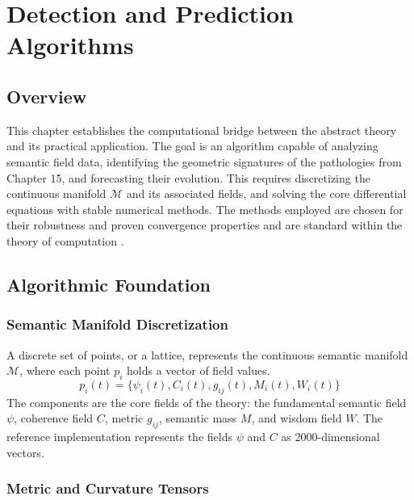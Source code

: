 \chapter{Detection and Prediction Algorithms}

\section{Overview}

This chapter establishes the computational bridge between the abstract theory and its practical application. The goal is an algorithm capable of analyzing semantic field data, identifying the geometric signatures of the pathologies from Chapter 15, and forecasting their evolution. This requires discretizing the continuous manifold \(\mathcal{M}\) and its associated fields, and solving the core differential equations with stable numerical methods. The methods employed are chosen for their robustness and proven convergence properties and are standard within the theory of computation \autocite{Sipser2012}.

\section{Algorithmic Foundation}

\subsection{Semantic Manifold Discretization}

A discrete set of points, or a lattice, represents the continuous semantic manifold \(\mathcal{M}\), where each point \(p_i\) holds a vector of field values.
\begin{equation}
p_i(t) = \{\psi_i(t), C_i(t), g_{ij}(t), M_i(t), W_i(t)\}
\end{equation}
The components are the core fields of the theory: the fundamental semantic field \(\psi\), coherence field \(C\), metric \(g_{ij}\), semantic mass \(M\), and wisdom field \(W\). The reference implementation represents the fields \(\psi\) and \(C\) as 2000-dimensional vectors.

\subsection{Metric and Curvature Tensors}

